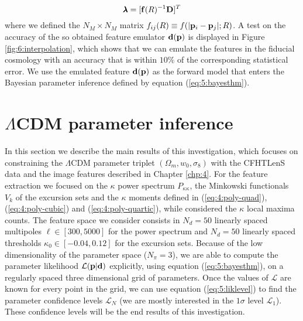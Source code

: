\begin{equation}
\label{eq:6:weights}
\pmb{\lambda} = [\mathbf{f}(R)^{-1}\mathbf{D}]^T
\end{equation} 
%
where we defined the $N_M\times N_M$ matrix $f_{ij}(R) \equiv f(\vert\mathbf{p}_i-\mathbf{p}_j\vert;R)$. A test on the accuracy of the so obtained feature emulator $\mathbf{d}(\mathbf{p})$ is displayed in Figure \ref{fig:6:interpolation}, which shows that we can emulate the features in the fiducial cosmology with an accuracy that is within $10\%$ of the corresponding statistical error. We use the emulated feature $\mathbf{d}(\mathbf{p})$ as the forward model that enters the Bayesian parameter inference defined by equation (\ref{eq:5:bayesthm}). 

\section{$\Lambda$CDM parameter inference}
In this section we describe the main results of this investigation, which focuses on constraining the $\Lambda$CDM parameter triplet $(\Omega_m,w_0,\sigma_8)$ with the CFHTLenS data and the image features described in Chapter \ref{chp:4}. For the feature extraction we focused on the $\kappa$ power spectrum $P_{\kappa\kappa}$, the Minkowski functionals $V_k$ of the excursion sets and the $\kappa$ moments defined in (\ref{eq:4:poly-quad}), (\ref{eq:4:poly-cubic}) and (\ref{eq:4:poly-quartic}), while \citep{PetriCFHTPeaks} considered the $\kappa$ local maxima counts. The feature space we consider consists in $N_d=50$ linearly spaced multipoles $\ell\in[300,5000]$ for the power spectrum and $N_d=50$ linearly spaced thresholds $\kappa_0\in[-0.04,0.12]$ for the excursion sets. Because of the low dimensionality of the parameter space ($N_\pi=3$), we are able to compute the parameter likelihood $\mathcal{L}(\mathbf{p}\vert\mathbf{d})$ explicitly, using equation (\ref{eq:5:bayesthm}), on a regularly spaced three dimensional grid of parameters. Once the values of $\mathcal{L}$ are known for every point in the grid, we can use equation (\ref{eq:5:liklevel}) to find the parameter confidence levels $\mathcal{L}_N$ (we are mostly interested in the $1\sigma$ level $\mathcal{L}_1$). These confidence levels will be the end results of this investigation.  

